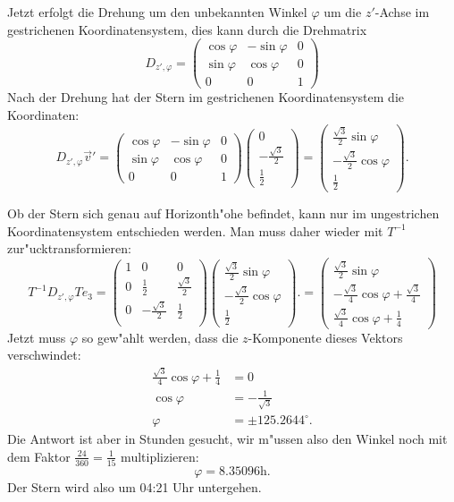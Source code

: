 \begin{loesung}
Jetzt erfolgt die Drehung um den unbekannten Winkel $\varphi$ um
die $z'$-Achse im gestrichenen Koordinatensystem, dies kann durch die
Drehmatrix
\[
D_{z',\varphi}
=
\begin{pmatrix}
\cos\varphi&-\sin\varphi&0\\
\sin\varphi& \cos\varphi&0\\
0&0&1
\end{pmatrix}
\]
Nach der Drehung hat der Stern im gestrichenen Koordinatensystem die
Koordinaten:
\[
D_{z',\varphi}\vec v'
=
\begin{pmatrix}
\cos\varphi&-\sin\varphi&0\\
\sin\varphi& \cos\varphi&0\\
0&0&1
\end{pmatrix}
\begin{pmatrix}
0\\-\frac{\sqrt{3}}2\\\frac12 
\end{pmatrix}
=
\begin{pmatrix}
\frac{\sqrt{3}}2\sin\varphi\\
-\frac{\sqrt{3}}2\cos\varphi\\
\frac12
\end{pmatrix}.
\]

Ob der Stern sich genau auf Horizonth"ohe befindet, kann nur im ungestrichen
Koordinatensystem entschieden werden.
Man muss daher wieder mit $T^{-1}$ zur"ucktransformieren:
\[
T^{-1}D_{z',\varphi}Te_3 = 
\begin{pmatrix}
1& 0&0\\
0&\frac12&\frac{\sqrt{3}}2\\
0&-\frac{\sqrt{3}}2&\frac12\\
\end{pmatrix}
\begin{pmatrix}
\frac{\sqrt{3}}2\sin\varphi\\
-\frac{\sqrt{3}}2\cos\varphi\\
\frac12
\end{pmatrix}.
=
\begin{pmatrix}
\frac{\sqrt{3}}2\sin\varphi\\
-\frac{\sqrt{3}}4\cos\varphi+\frac{\sqrt{3}}4\\
\frac{\sqrt{3}}4\cos\varphi+\frac14
\end{pmatrix}
\]
Jetzt muss $\varphi$ so gew"ahlt werden, dass die $z$-Komponente dieses
Vektors verschwindet:
\begin{align*}
\frac{\sqrt{3}}4\cos\varphi+\frac14&=0\\
\cos\varphi&=-\frac1{\sqrt{3}}\\
\varphi&=\pm 125.2644^\circ.
\end{align*}
Die Antwort ist aber in Stunden gesucht, wir m"ussen also den Winkel
noch mit dem Faktor $\frac{24}{360}=\frac1{15}$ multiplizieren:
\[
\varphi=8.35096\text{h}.
\]
Der Stern wird also um 04:21 Uhr untergehen.
\end{loesung}

